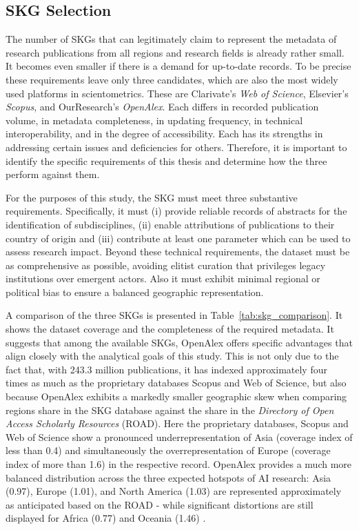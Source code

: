 \documentclass{article}
\begin{document}
	\subsection{SKG Selection}
	\label{skg_selection}
	
	The number of SKGs that can legitimately claim to represent the metadata of research publications from all regions and research fields is already rather small. It becomes even smaller if there is a demand for up-to-date records. To be precise these requirements leave only three candidates, which are also the most widely used platforms in scientometrics. These are Clarivate's \textit{Web of Science}, Elsevier's \textit{Scopus}, and OurResearch's \textit{OpenAlex}. Each differs in recorded publication volume, in metadata completeness, in updating frequency, in technical interoperability, and in the degree of accessibility. Each has its strengths in addressing certain issues and deficiencies for others. Therefore, it is important to identify the specific requirements of this thesis and determine how the three perform against them.
	
	For the purposes of this study, the SKG must meet three substantive requirements. Specifically, it must (i) provide reliable records of abstracts for the identification of subdisciplines, (ii) enable attributions of publications to their country of origin and (iii) contribute at least one parameter which can be used to assess research impact. Beyond these technical requirements, the dataset must be as comprehensive as possible, avoiding elitist curation that privileges legacy institutions over emergent actors. Also it must exhibit minimal regional or political bias to ensure a balanced geographic representation.
	
	A comparison of the three SKGs is presented in Table~\ref{tab:skg_comparison}.  It shows the dataset coverage and the completeness of the required metadata. It suggests that among the available SKGs, OpenAlex offers specific advantages that align closely with the analytical goals of this study. This is not only due to the fact that, with 243.3 million publications, it has indexed approximately four times as much as the proprietary databases Scopus and Web of Science, but also because OpenAlex exhibits a markedly smaller geographic skew when comparing regions share in the SKG database against the share in the \textit{Directory of Open Access Scholarly Resources} (ROAD). Here the proprietary databases, Scopus and Web of Science show a pronounced underrepresentation of Asia (coverage index of less than 0.4) and simultaneously the overrepresentation of Europe (coverage index of more than 1.6) in the respective record. OpenAlex provides a much more balanced distribution across the three expected hotspots of AI research: Asia (0.97), Europe (1.01), and North America (1.03) are represented approximately as anticipated based on the ROAD - while significant distortions are still displayed for Africa (0.77) and Oceania (1.46) \cite{Maddi2025GeographicalDisciplinaryCoverage}.
	
\end{document}
